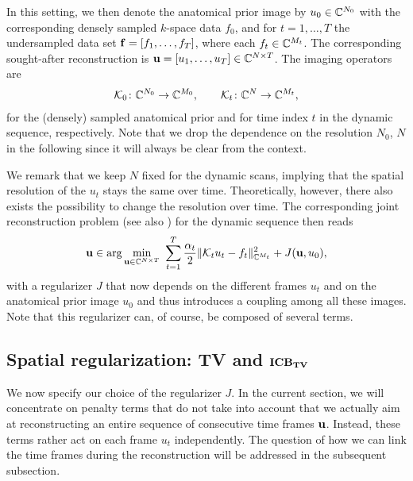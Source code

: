 In this setting, we then denote the anatomical prior image by $u_0 \in \mathbb{C}^{N_0}$ with the corresponding densely sampled $k$-space data $f_0$, and for $t = 1, \dots, T$ the undersampled data set $\mathbf{f} = [f_1, \dots, f_T]$, where each $f_t \in \mathbb{C}^{M_t}$. 
The corresponding sought-after reconstruction is $\mathbf{u} = [u_1, \dots, u_T] \in \mathbb{C}^{N \times T}$.
The imaging operators are 
\begin{align*}
      \mathcal{K}_0 \colon \mathbb{C}^{N_0} \to\mathbb{C}^{M_0}, \qquad \mathcal{K}_t \colon \mathbb{C}^{N} \to \mathbb{C}^{M_t},
\end{align*}
for the (densely) sampled anatomical prior and for time index $t$ in the dynamic sequence, respectively. 
Note that we drop the dependence on the resolution $N_0$, $N$ in the following since it will always be clear from the context.

We remark that we keep $N$ fixed for the dynamic scans, implying that the spatial resolution of the $u_t$ stays the same over time. 
Theoretically, however, there also exists the possibility to change the resolution over time.
The corresponding joint reconstruction problem (see also \cite{Ehrhardt2015,Rasch2017}) for the dynamic sequence then reads 
\begin{align*}
      \mathbf{u} \in \arg \min_{\mathbf{u} \in \mathbb{C}^{N\times T}} ~ \sum_{t=1}^T \frac{\alpha_t}{2} \| \mathcal{K}_t u_t - f_t \|_{\mathbb{C}^{M_t}}^2 + J(\mathbf{u},u_0),
\end{align*}
with a regularizer $J$ that now depends on the different frames $u_t$ and on the anatomical prior image $u_0$ and thus introduces a coupling among all these images. 
Note that this regularizer can, of course, be composed of several terms.

\subsection{Spatial regularization: TV and $\boldsymbol{\mathrm{ICB}_{\mathrm{TV}}}$} 
We now specify our choice of the regularizer $J$. 
In the current section, we will concentrate on penalty terms that do not take into account that we actually aim at reconstructing an entire sequence of consecutive time frames $\mathbf{u}$. 
Instead, these terms rather act on each frame $u_t$ independently. 
The question of how we can link the time frames during the reconstruction will be addressed in the subsequent subsection.


\label{subsec:spatial regularization}
